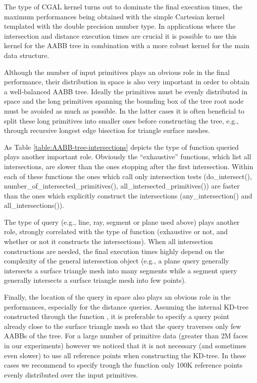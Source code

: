 The type of CGAL kernel turns out to dominate the final execution times, the maximum performances being obtained with the simple Cartesian kernel templated with the double precision number type. In applications where the intersection and distance execution times are crucial it is possible to use this kernel for the AABB tree in combination with a more robust kernel for the main data structure.

Although the number of input primitives plays an obvious role in the final performance, their distribution in space is also very important in order to obtain a well-balanced AABB tree. Ideally the primitives must be evenly distributed in space and the long primitives spanning the bounding box of the tree root node must be avoided as much as possible. In the latter cases it is often beneficial to split these long primitives into smaller ones before constructing the tree, e.g., through recursive longest edge bisection for triangle surface meshes.

As Table \ref{table:AABB-tree-intersections} depicts the type of function queried plays another important role. Obviously the ``exhaustive'' functions, which list all intersections, are slower than the ones stopping after the first intersection. Within each of these functions the ones which call only intersection tests (do\_intersect(), number\_of\_intersected\_primitives(), all\_intersected\_primitives()) are faster than the ones which explicitly construct the intersections (any\_intersection() and all\_intersections()).

The type of query (e.g., line, ray, segment or plane used above) plays another role, strongly correlated with the type of function (exhaustive or not, and whether or not it constructs the intersections). When all intersection constructions are needed, the final execution times highly depend on the complexity of the general intersection object (e.g., a plane query generally intersects a surface triangle mesh into many segments while a segment query generally intersects a surface triangle mesh into few points).

Finally, the location of the query in space also plays an obvious role in the performances, especially for the distance queries. Assuming the internal KD-tree constructed through the function , it is preferable to specify a query point already close to the surface triangle mesh so that the query traverses only few AABBs of the tree. For a large number of primitive data (greater than 2M faces in our experiments) however we noticed that it is not necessary (and sometimes even slower) to use all reference points when constructing the KD-tree. In these cases we recommend to specify trough the function  only 100K reference points evenly distributed over the input primitives.


